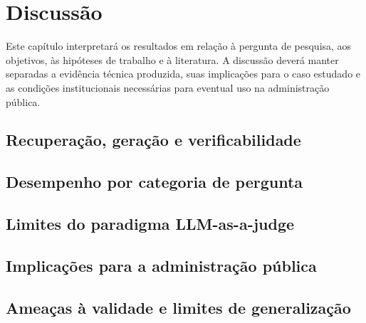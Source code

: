 \section{Discussão}

Este capítulo interpretará os resultados em relação à pergunta de pesquisa, aos objetivos, às hipóteses de trabalho e à literatura. A discussão deverá manter separadas a evidência técnica produzida, suas implicações para o caso estudado e as condições institucionais necessárias para eventual uso na administração pública.

\subsection{Recuperação, geração e verificabilidade}


\subsection{Desempenho por categoria de pergunta}


\subsection{Limites do paradigma LLM-as-a-judge}


\subsection{Implicações para a administração pública}


\subsection{Ameaças à validade e limites de generalização}

